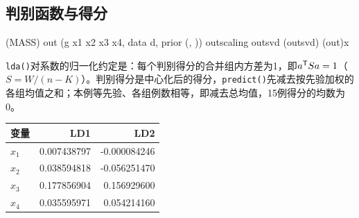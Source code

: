 \subsection{判别函数与得分}
\begin{code}
(MASS)
out \ROperator{<-} (g \ROperator{~} x1 \ROperator{+} x2 \ROperator{+} x3 \ROperator{+} x4, data \ROperator{=} d, prior \ROperator{=} (\ROperator{/}, ))
out\ROperator{\$}scaling                          
out\ROperator{\$}svd\ROperator{\textasciicircum{}} \ROperator{/} (out\ROperator{\$}svd\ROperator{\textasciicircum{}})        
(out)\ROperator{\$}x                     
\end{code}
\texttt{lda()}对系数的归一化约定是：每个判别得分的合并组内方差为1，即$a^{\mathsf T} Sa=1$（$S=W/(n-K)$）。判别得分是中心化后的得分，\texttt{predict()}先减去按先验加权的各组均值之和；本例等先验、各组例数相等，即减去总均值，15例得分的均数为0。\par\addvspace{5pt}\begin{center}\begin{minipage}{\linewidth}\centering
\small
{}
\begin{tabular}{lrr}\toprule
{\bfseries 变量 }&{\bfseries  LD1 }&{\bfseries  LD2}\\\midrule
$x_1$ & 0.007438797 & -0.000084246\\
$x_2$ & 0.038594818 & -0.056251470\\
$x_3$ & 0.177856904 & 0.156929600\\
$x_4$ & 0.035595971 & 0.054214160\\
\bottomrule\end{tabular}
\end{minipage}\end{center}

